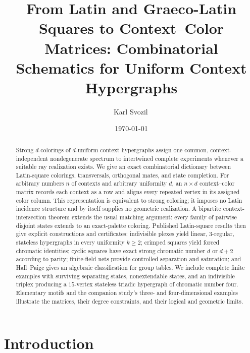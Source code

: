 \documentclass[aps,pra,reprint,superscriptaddress,longbibliography,nofootinbib,floatfix,10pt]{revtex4-2}
\theoremstyle{definition}\newtheorem{definition}[theorem]{Definition}
\theoremstyle{remark}\newtheorem{remark}[theorem]{Remark}
\begin{document}
\title{From Latin and Graeco-Latin Squares to Context--Color Matrices: Combinatorial Schematics for Uniform Context Hypergraphs}

\author{Karl Svozil\,}

\date{\today}

\begin{abstract}
Strong $d$-colorings of $d$-uniform context hypergraphs assign one common, context-independent nondegenerate spectrum to intertwined complete experiments whenever a suitable ray realization exists. We give an exact combinatorial dictionary between Latin-square colorings, transversals, orthogonal mates, and state completion. For arbitrary numbers $n$ of contexts and arbitrary uniformity $d$, an $n\times d$ context--color matrix records each context as a row and aligns every repeated vertex in its assigned color column. This representation is equivalent to strong coloring; it imposes no Latin incidence structure and by itself supplies no geometric realization. A bipartite context-intersection theorem extends the usual matching argument: every family of pairwise disjoint states extends to an exact-palette coloring. Published Latin-square results then give explicit constructions and certificates: indivisible plexes yield linear, $3$-regular, stateless hypergraphs in every uniformity $k\ge2$; crimped squares yield forced chromatic identities; cyclic squares have exact strong chromatic number $d$ or $d+2$ according to parity; finite-field nets provide controlled separation and saturation; and Hall--Paige gives an algebraic classification for group tables. We include complete finite examples with surviving separating states, nonextendable states, and an indivisible triplex producing a $15$-vertex stateless triadic hypergraph of chromatic number four. Elementary motifs and the companion study's three- and four-dimensional examples illustrate the matrices, their degree constraints, and their logical and geometric limits.

\end{abstract}

\maketitle

\section{Introduction}\label{sec:intro}
\end{document}
